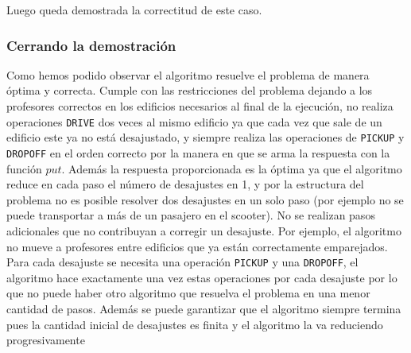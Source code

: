 \documentclass[11pt]{article}
\begin{document}
    Luego queda demostrada la correctitud de este caso.

    \subsubsection{Cerrando la demostración}
    Como hemos podido observar el algoritmo resuelve el problema de manera óptima y correcta. Cumple con las restricciones del
    problema dejando a los profesores correctos en los edificios necesarios al final de la ejecución, no realiza operaciones
    \texttt{DRIVE} dos veces al mismo edificio ya que cada vez que sale de un edificio este ya no está desajustado, y siempre realiza
    las operaciones de \texttt{PICKUP} y \texttt{DROPOFF} en el orden correcto por la manera en que se arma la respuesta con la
    función $put$. Además la respuesta proporcionada es la óptima ya que el algoritmo reduce en cada paso el número de desajustes en 
    1, y por la estructura del problema no es posible resolver dos desajustes en un solo paso (por ejemplo no se puede transportar a 
    más de un pasajero en el scooter). No se realizan pasos adicionales que no contribuyan a corregir un desajuste. Por ejemplo, el 
    algoritmo no mueve a profesores entre edificios que ya están correctamente emparejados. Para cada desajuste se necesita una
    operación \texttt{PICKUP} y una \texttt{DROPOFF}, el algoritmo hace exactamente una vez estas operaciones por cada desajuste
    por lo que no puede haber otro algoritmo que resuelva el problema en una menor cantidad de pasos. Además se puede garantizar
    que el algoritmo siempre termina pues la cantidad inicial de desajustes es finita y el algoritmo la va reduciendo progresivamente

    
\end{document}
